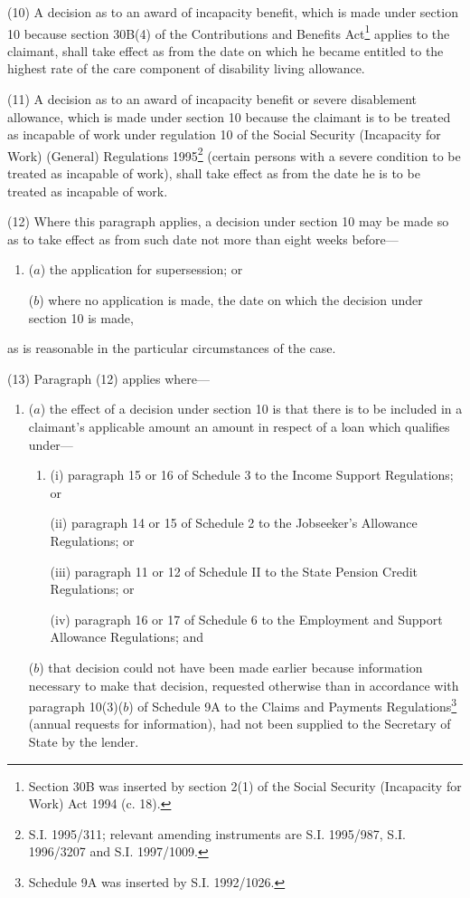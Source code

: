 \documentclass[12pt,a4paper]{article}
\begin{document}
(10) A decision as to an award of incapacity benefit, which is made under section 10 because section 30B(4) of the Contributions and Benefits Act\footnote{\frenchspacing Section 30B was inserted by section 2(1) of the Social Security (Incapacity for Work) Act 1994 (c. 18).} applies to the claimant, shall take effect as from the date on which he became entitled to the highest rate of the care component of disability living allowance.

(11) A decision as to an award of incapacity benefit or severe disablement allowance, which is made under section 10 because the claimant is to be treated as incapable of work under regulation 10 of the Social Security (Incapacity for Work) (General) Regulations 1995\footnote{\frenchspacing S.I. 1995/311; relevant amending instruments are S.I. 1995/987, S.I. 1996/3207 and S.I. 1997/1009.} (certain persons with a severe condition to be treated as incapable of work), shall take effect as from the date he is to be treated as incapable of work.

(12) Where this paragraph applies, a decision under section 10 may be made so as to take effect as from such date not more than eight weeks before—
\begin{enumerate}\item[]
($a$) the application for supersession; or

($b$) where no application is made, the date on which the decision under section 10 is made,
\end{enumerate}
as is reasonable in the particular circumstances of the case.

(13) Paragraph (12) applies where—
\begin{enumerate}\item[]
($a$) the effect of a decision under section 10 is that there is to be included in a claimant’s applicable amount an amount in respect of a loan which qualifies under—
\begin{enumerate}\item[]
(i) paragraph 15 or 16 of Schedule 3 to the Income Support Regulations; or

(ii) paragraph 14 or 15 of Schedule 2 to the Jobseeker’s Allowance Regulations;
or

    (iii) 
    paragraph 11 or 12 of Schedule II to the State Pension Credit Regulations; 
or  %

(iv) paragraph 16 or 17 of Schedule 6 to the Employment and Support Allowance Regulations; and
\end{enumerate}

($b$) that decision could not have been made earlier because information necessary to make that decision, requested otherwise than in accordance with paragraph 10(3)($b$) of Schedule 9A to the Claims and Payments Regulations\footnote{\frenchspacing Schedule 9A was inserted by S.I. 1992/1026.} (annual requests for information), had not been supplied to the Secretary of State by the lender.
\end{enumerate}
\end{document}
